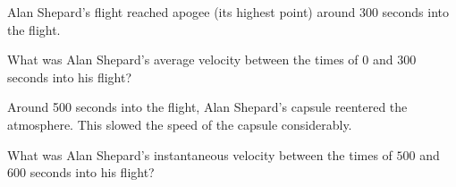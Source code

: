 \documentclass{ximera}
\begin{document}
Alan Shepard's flight reached apogee (its highest point) around 300
seconds into the flight.

\begin{question}
  What was Alan Shepard's average velocity between the times of $0$ and
  $300$ seconds into his flight?
  \begin{multipleChoice}
  \end{multipleChoice}  
\end{question}

Around 500 seconds into the flight, Alan Shepard's capsule reentered
the atmosphere. This slowed the speed of the capsule considerably.

\begin{question}
  What was Alan Shepard's instantaneous velocity between the times of
  $500$ and $600$ seconds into his flight?
  \begin{multipleChoice}
  \end{multipleChoice}
\end{question}
\end{document}

